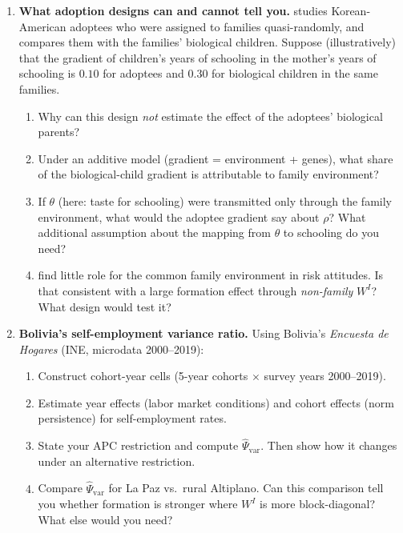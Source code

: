 \documentclass[../structural_economics_book.tex]{subfiles}
\begin{document}
\begin{enumerate}[label=\textbf{11.\arabic*}, leftmargin=3em]
\item \textbf{What adoption designs can and cannot tell you.} \citet{sacerdote2007how} studies Korean-American adoptees who were assigned to families quasi-randomly, and compares them with the families' biological children. Suppose (illustratively) that the gradient of children's years of schooling in the mother's years of schooling is $0.10$ for adoptees and $0.30$ for biological children in the same families.
\begin{enumerate}
\item Why can this design \textit{not} estimate the effect of the adoptees' biological parents?
\item Under an additive model (gradient = environment + genes), what share of the biological-child gradient is attributable to family environment?
\item If $\theta$ (here: taste for schooling) were transmitted only through the family environment, what would the adoptee gradient say about $\rho$? What additional assumption about the mapping from $\theta$ to schooling do you need?
\item \citet{cesarini2009genetic} find little role for the common family environment in risk attitudes. Is that consistent with a large formation effect through \textit{non-family} $W^I$? What design would test it?
\end{enumerate}

\item \textbf{Bolivia's self-employment variance ratio.} Using Bolivia's \textit{Encuesta de Hogares} (INE, microdata 2000--2019):
\begin{enumerate}
\item Construct cohort-year cells (5-year cohorts $\times$ survey years 2000--2019).
\item Estimate year effects (labor market conditions) and cohort effects (norm persistence) for self-employment rates.
\item State your APC restriction and compute $\hat{\Psi}_{\text{var}}$. Then show how it changes under an alternative restriction.
\item Compare $\hat{\Psi}_{\text{var}}$ for La Paz vs.\ rural Altiplano. Can this comparison tell you whether formation is stronger where $W^I$ is more block-diagonal? What else would you need?
\end{enumerate}


\end{enumerate}
\end{document}
